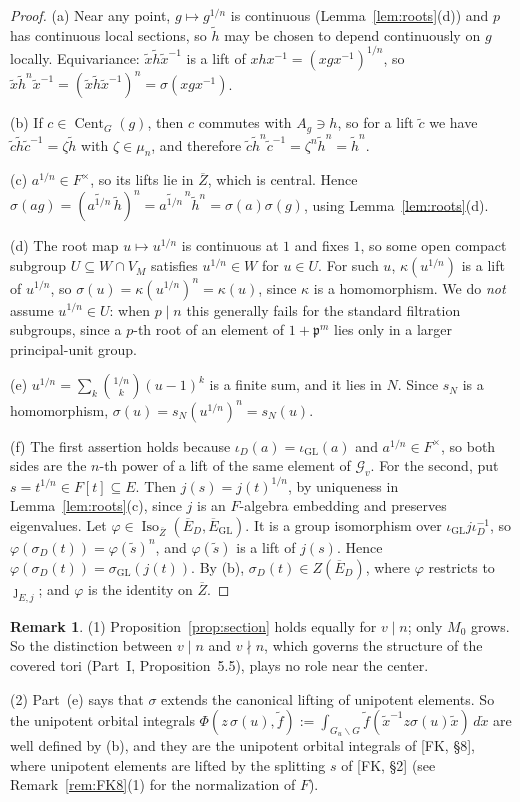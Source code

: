 \documentclass[12pt]{article}
\newcommand{\ov}[1]{\overline{#1}}
\newcommand{\fp}{\mathfrak{p}}
\newcommand{\Iso}{\operatorname{Iso}}
\newcommand{\Cent}{\operatorname{Cent}}
\newcommand{\GL}{\mathrm{GL}}
\newcommand{\Zb}{\ov{Z}}
\newcommand{\Eb}{\ov{E}}
\newcommand{\cG}{\mathcal{G}}
\newcommand{\iD}{\iota_D}
\newcommand{\iG}{\iota_{\GL}}
\newcommand{\jj}{\jmath}
\newcommand{\sg}{\sigma}
\theoremstyle{plain}
\theoremstyle{definition}
\newtheorem{remark}[theorem]{Remark}
\begin{document}
\begin{proof}
(a) Near any point, $g\mapsto g^{1/n}$ is continuous (Lemma~\ref{lem:roots}(d)) and $p$ has continuous local sections, so $\tilde h$ may be chosen to depend continuously on $g$ locally. Equivariance: $\tilde x\tilde h\tilde x^{-1}$ is a lift of $xhx^{-1}=(xgx^{-1})^{1/n}$, so $\tilde x\tilde h^n\tilde x^{-1}=(\tilde x\tilde h\tilde x^{-1})^n=\sg(xgx^{-1})$.

(b) If $c\in\Cent_G(g)$, then $c$ commutes with $A_g\ni h$, so for a lift $\tilde c$ we have $\tilde c\tilde h\tilde c^{-1}=\zeta\tilde h$ with $\zeta\in\mu_n$, and therefore $\tilde c\tilde h^n\tilde c^{-1}=\zeta^n\tilde h^n=\tilde h^n$.

(c) $a^{1/n}\in F^\times$, so its lifts lie in $\Zb$, which is central. Hence $\sg(ag)=(\widetilde{a^{1/n}}\,\tilde h)^n=\widetilde{a^{1/n}}^{\,n}\tilde h^n=\sg(a)\sg(g)$, using Lemma~\ref{lem:roots}(d).

(d) The root map $u\mapsto u^{1/n}$ is continuous at $1$ and fixes $1$, so some open compact subgroup $U\subseteq W\cap V_M$ satisfies $u^{1/n}\in W$ for $u\in U$. For such $u$, $\kappa(u^{1/n})$ is a lift of $u^{1/n}$, so $\sg(u)=\kappa(u^{1/n})^n=\kappa(u)$, since $\kappa$ is a homomorphism. We do \emph{not} assume $u^{1/n}\in U$: when $p\mid n$ this generally fails for the standard filtration subgroups, since a $p$-th root of an element of $1+\fp^m$ lies only in a larger principal-unit group.

(e) $u^{1/n}=\sum_k\binom{1/n}{k}(u-1)^k$ is a finite sum, and it lies in $N$. Since $s_N$ is a homomorphism, $\sg(u)=s_N(u^{1/n})^n=s_N(u)$.

(f) The first assertion holds because $\iD(a)=\iG(a)$ and $a^{1/n}\in F^\times$, so both sides are the $n$-th power of a lift of the same element of $\cG_v$. For the second, put $s=t^{1/n}\in F[t]\subseteq E$. Then $j(s)=j(t)^{1/n}$, by uniqueness in Lemma~\ref{lem:roots}(c), since $j$ is an $F$-algebra embedding and preserves eigenvalues. Let $\varphi\in\Iso_{\Zb}(\Eb_D,\Eb_{\GL})$. It is a group isomorphism over $\iG j\iD^{-1}$, so $\varphi(\sg_D(t))=\varphi(\tilde s)^n$, and $\varphi(\tilde s)$ is a lift of $j(s)$. Hence $\varphi(\sg_D(t))=\sg_{\GL}(j(t))$. By (b), $\sg_D(t)\in Z(\Eb_D)$, where $\varphi$ restricts to $\jj_{E,j}$; and $\varphi$ is the identity on $\Zb$.
\end{proof}

\begin{remark}
(1) Proposition~\ref{prop:section} holds equally for $v\mid n$; only $M_0$ grows. So the distinction between $v\mid n$ and $v\nmid n$, which governs the structure of the covered tori (Part~I, Proposition~5.5), plays no role near the center.

(2) Part~(e) says that $\sg$ extends the canonical lifting of unipotent elements. So the unipotent orbital integrals $\Phi(z\,\sg(u),\tilde f):=\int_{G_u\backslash G}\tilde f(\tilde x^{-1}z\sg(u)\tilde x)\,d\dot x$ are well defined by (b), and they are the unipotent orbital integrals of [FK, \S8], where unipotent elements are lifted by the splitting $s$ of [FK, \S2] (see Remark~\ref{rem:FK8}(1) for the normalization of $F$).
\end{remark}
\end{document}
